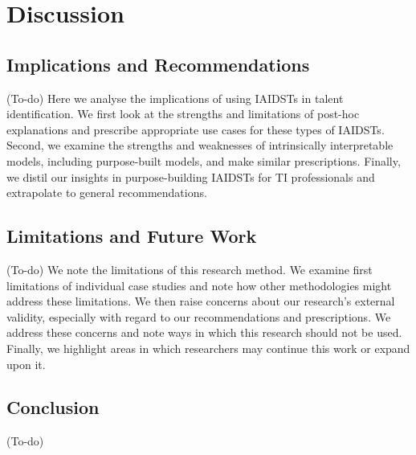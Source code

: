 

\chapter{\label{ch:discussion}Discussion}

\minitoc

\section{Implications and Recommendations}
(To-do) Here we analyse the implications of using IAIDSTs in talent identification. We first look at the strengths and limitations of post-hoc explanations and prescribe appropriate use cases for these types of IAIDSTs. Second, we examine the strengths and weaknesses of intrinsically interpretable models, including purpose-built models, and make similar prescriptions. Finally, we distil our insights in purpose-building IAIDSTs for TI professionals and extrapolate to general recommendations.

\section{Limitations and Future Work}
(To-do) We note the limitations of this research method. We examine first limitations of individual case studies and note how other methodologies might address these limitations. We then raise concerns about our research's external validity, especially with regard to our recommendations and prescriptions. We address these concerns and note ways in which this research should not be used. Finally, we highlight areas in which researchers may continue this work or expand upon it.

\section{Conclusion}
(To-do)